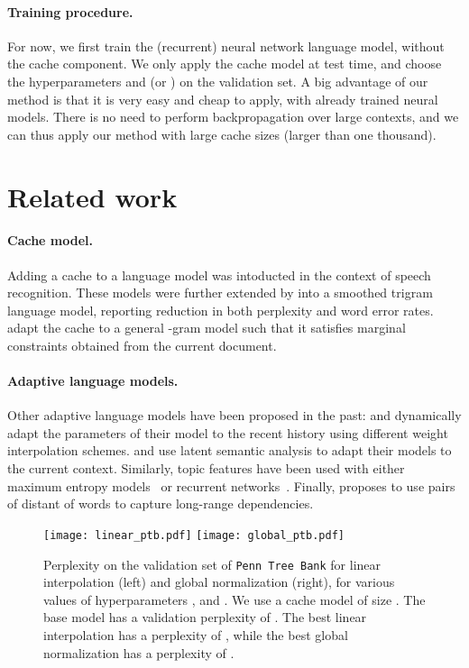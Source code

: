 \documentclass{article} \usepackage{iclr2017_conference,times}
\begin{document}
\paragraph{Training procedure.}
For now, we first train the (recurrent) neural network language model,
without the cache component.  We only apply the cache model at test
time, and choose the hyperparameters  and  (or
) on the validation set. A big advantage of our
method is that it is very easy and cheap to apply, with
already trained neural models.  There is no need to perform
backpropagation over large contexts, and we can thus apply our method
with large cache sizes (larger than one thousand).
 
\section{Related work}

\paragraph{Cache model.}
Adding a cache to a language model was intoducted in the context of speech
recognition\citep{kuhn1988speech,kupiec1989probabilistic,kuhn1990cache}.
These models were further extended by \citet{jelinek1991dynamic} into a smoothed
trigram language model, reporting reduction in both perplexity and word error rates.
\citet{della1992adaptive} adapt the cache to a general -gram model
such that it satisfies marginal constraints obtained from the current document.

\paragraph{Adaptive language models.} Other adaptive language models have been
proposed in the past: \citet{kneser1993dynamic} and \citet{iyer1999modeling}
dynamically adapt the parameters of their model to the recent history using
different weight interpolation schemes.  \citet{bellegarda2000exploiting} and
\citet{coccaro1998towards} use latent semantic analysis to adapt their models
to the current context.  Similarly, topic features have been used with either
maximum entropy models~\citep{khudanpur2000maximum} or recurrent
networks~\citep{mikolov2012context,wang2015larger}.  Finally,
  \citet{lau1993trigger} proposes to use pairs of distant of words to capture
  long-range dependencies.

\begin{figure}
  \centering
  \texttt{[image: linear\_ptb.pdf]}
  \texttt{[image: global\_ptb.pdf]}

  \vspace{-0.5cm}
  \caption{Perplexity on the validation set of \texttt{Penn Tree Bank} for linear interpolation (left) and global normalization (right), for various values of hyperparameters ,  and .
    We use a cache model of size . The base model has a validation perplexity of .
    The best linear interpolation has a perplexity of , while the best global normalization has a perplexity of .}
  \label{fig:ptb}
\end{figure}
\end{document}
